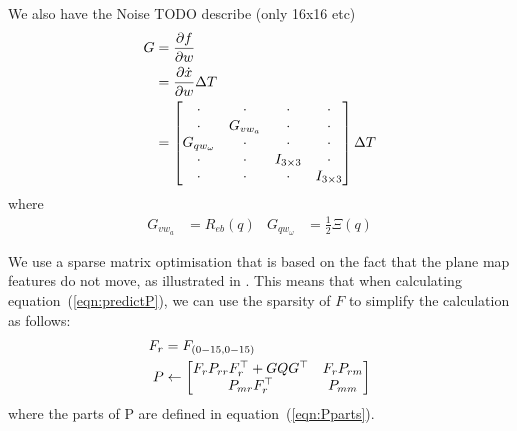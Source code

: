 \documentclass[]{article}
\begin{document}
{We also have the Noise TODO describe (only 16x16 etc)
\begin{align}
	G &= \frac{\partial f}{\partial w} \notag \\
	&=
	\frac{\partial \dot{x}}{\partial w} \Delta T \notag \\
	&=
	\left[
	\begin{matrix}
		\cdot 			& \cdot 	& \cdot 		& \cdot \\
		\cdot 			& G_{vw_a} 	& \cdot 		& \cdot \\
		G_{qw_\omega}	& \cdot 	& \cdot 		& \cdot \\
		\cdot 			& \cdot 	& I_{3\times3}	& \cdot \\
		\cdot 			& \cdot 	& \cdot 		& I_{3\times3}
	\end{matrix}
	\right]
	\Delta T
\end{align}
where
\begin{align}
	G_{vw_a} &= R_{eb}(q)
&
	G_{qw_\omega} &= \frac{1}{2} \Xi(q)
\end{align}

We use a sparse matrix optimisation that is based on the fact that the plane map features do not move, as illustrated in \cite{Sola2013}.
This means that when calculating equation~(\ref{eqn:predictP}), we can use the sparsity of $F$ to simplify the calculation as follows:
\begin{align}
	F_r &= F_{(0-15,0-15)} \notag \\
	P &\leftarrow
	\left[
	\begin{matrix}
		F_r P_{rr} F_r^\top + GQG^\top 	& F_r P_{rm} \\
		P_{mr} F_r^\top 				& P_{mm}
	\end{matrix}
	\right]
\end{align}
where the parts of P are defined in equation~(\ref{eqn:Pparts}).

}
\end{document}
